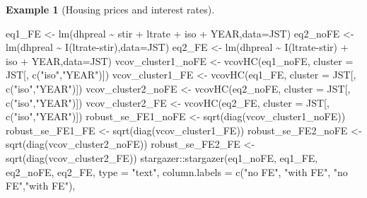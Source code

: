 \documentclass[
  12pt,
]{book}
\newenvironment{Shaded}{\begin{snugshade}}{\end{snugshade}}
\newcommand{\AttributeTok}[1]{\textcolor[rgb]{0.77,0.63,0.00}{#1}}
\newcommand{\FunctionTok}[1]{\textcolor[rgb]{0.00,0.00,0.00}{#1}}
\newcommand{\NormalTok}[1]{#1}
\newcommand{\OtherTok}[1]{\textcolor[rgb]{0.56,0.35,0.01}{#1}}
\newcommand{\SpecialCharTok}[1]{\textcolor[rgb]{0.00,0.00,0.00}{#1}}
\newcommand{\StringTok}[1]{\textcolor[rgb]{0.31,0.60,0.02}{#1}}
\theoremstyle{definition}
\theoremstyle{definition}
\newtheorem{example}{Example}[chapter]
\theoremstyle{definition}
\theoremstyle{definition}
\theoremstyle{remark}
\begin{document}
\begin{example}[Housing prices and interest rates]
\begin{Shaded}
\begin{Highlighting}[]
\NormalTok{eq1\_FE   }\OtherTok{\textless{}{-}} \FunctionTok{lm}\NormalTok{(dhpreal }\SpecialCharTok{\textasciitilde{}}\NormalTok{ stir }\SpecialCharTok{+}\NormalTok{ ltrate }\SpecialCharTok{+}\NormalTok{ iso }\SpecialCharTok{+}\NormalTok{ YEAR,}\AttributeTok{data=}\NormalTok{JST)}
\NormalTok{eq2\_noFE }\OtherTok{\textless{}{-}} \FunctionTok{lm}\NormalTok{(dhpreal }\SpecialCharTok{\textasciitilde{}} \FunctionTok{I}\NormalTok{(ltrate}\SpecialCharTok{{-}}\NormalTok{stir),}\AttributeTok{data=}\NormalTok{JST)}
\NormalTok{eq2\_FE }\OtherTok{\textless{}{-}} \FunctionTok{lm}\NormalTok{(dhpreal }\SpecialCharTok{\textasciitilde{}} \FunctionTok{I}\NormalTok{(ltrate}\SpecialCharTok{{-}}\NormalTok{stir) }\SpecialCharTok{+}\NormalTok{ iso }\SpecialCharTok{+}\NormalTok{ YEAR,}\AttributeTok{data=}\NormalTok{JST)}
\NormalTok{vcov\_cluster1\_noFE }\OtherTok{\textless{}{-}} \FunctionTok{vcovHC}\NormalTok{(eq1\_noFE, }\AttributeTok{cluster =}\NormalTok{ JST[, }\FunctionTok{c}\NormalTok{(}\StringTok{"iso"}\NormalTok{,}\StringTok{"YEAR"}\NormalTok{)])}
\NormalTok{vcov\_cluster1\_FE   }\OtherTok{\textless{}{-}} \FunctionTok{vcovHC}\NormalTok{(eq1\_FE, }\AttributeTok{cluster =}\NormalTok{ JST[, }\FunctionTok{c}\NormalTok{(}\StringTok{"iso"}\NormalTok{,}\StringTok{"YEAR"}\NormalTok{)])}
\NormalTok{vcov\_cluster2\_noFE }\OtherTok{\textless{}{-}} \FunctionTok{vcovHC}\NormalTok{(eq2\_noFE, }\AttributeTok{cluster =}\NormalTok{ JST[, }\FunctionTok{c}\NormalTok{(}\StringTok{"iso"}\NormalTok{,}\StringTok{"YEAR"}\NormalTok{)])}
\NormalTok{vcov\_cluster2\_FE   }\OtherTok{\textless{}{-}} \FunctionTok{vcovHC}\NormalTok{(eq2\_FE, }\AttributeTok{cluster =}\NormalTok{ JST[, }\FunctionTok{c}\NormalTok{(}\StringTok{"iso"}\NormalTok{,}\StringTok{"YEAR"}\NormalTok{)])}
\NormalTok{robust\_se\_FE1\_noFE }\OtherTok{\textless{}{-}} \FunctionTok{sqrt}\NormalTok{(}\FunctionTok{diag}\NormalTok{(vcov\_cluster1\_noFE))}
\NormalTok{robust\_se\_FE1\_FE   }\OtherTok{\textless{}{-}} \FunctionTok{sqrt}\NormalTok{(}\FunctionTok{diag}\NormalTok{(vcov\_cluster1\_FE))}
\NormalTok{robust\_se\_FE2\_noFE }\OtherTok{\textless{}{-}} \FunctionTok{sqrt}\NormalTok{(}\FunctionTok{diag}\NormalTok{(vcov\_cluster2\_noFE))}
\NormalTok{robust\_se\_FE2\_FE   }\OtherTok{\textless{}{-}} \FunctionTok{sqrt}\NormalTok{(}\FunctionTok{diag}\NormalTok{(vcov\_cluster2\_FE))}
\NormalTok{stargazer}\SpecialCharTok{::}\FunctionTok{stargazer}\NormalTok{(eq1\_noFE, eq1\_FE, eq2\_noFE, eq2\_FE, }\AttributeTok{type =} \StringTok{"text"}\NormalTok{,}
                     \AttributeTok{column.labels =} \FunctionTok{c}\NormalTok{(}\StringTok{"no FE"}\NormalTok{, }\StringTok{"with FE"}\NormalTok{, }\StringTok{"no FE"}\NormalTok{,}\StringTok{"with FE"}\NormalTok{),}

\end{Highlighting}
\end{Shaded}
\end{example}
\end{document}
